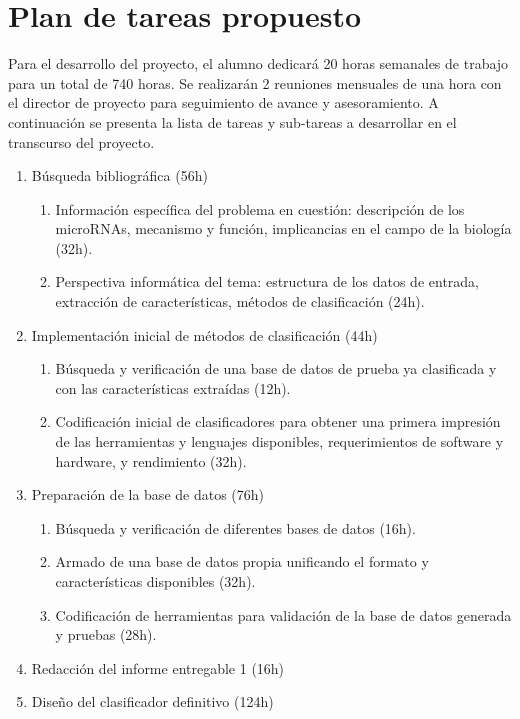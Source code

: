 \documentclass[12pt,bibliography=oldstyle,DIV=14,parskip=full-,titlepage]{scrartcl}
\begin{document}
\section{Plan de tareas propuesto}
Para el desarrollo del proyecto, el alumno dedicará 20 horas semanales
de trabajo para un total de 740 horas.  Se realizarán 2
reuniones mensuales de una hora con el director de proyecto para
seguimiento de avance y asesoramiento.
%
A continuación se presenta la lista de tareas y sub-tareas a
desarrollar en el transcurso del proyecto.
\begin{enumerate}
\item Búsqueda bibliográfica (56h)
  \begin{enumerate}
  \item Información específica del problema en cuestión: descripción
    de los microRNAs, mecanismo y función, implicancias en el campo de
    la biología (32h).
  \item Perspectiva informática del tema: estructura de los datos de
    entrada, extracción de características, métodos de clasificación
    (24h).
  \end{enumerate}
\item Implementación inicial de métodos de clasificación (44h)
  \begin{enumerate}
  \item Búsqueda y verificación de una base de datos de prueba ya
    clasificada y con las características extraídas (12h).
  \item Codificación inicial de clasificadores para obtener una
    primera impresión de las herramientas y lenguajes disponibles,
    requerimientos de software y hardware, y rendimiento (32h).
  \end{enumerate}
\item Preparación de la base de datos (76h)
  \begin{enumerate}
  \item Búsqueda y verificación de diferentes bases de datos (16h).
  \item Armado de una base de datos propia unificando el formato y
    características disponibles (32h).
  \item Codificación de herramientas para validación de la base de
    datos generada y pruebas (28h).
  \end{enumerate}
\item Redacción del informe entregable 1 (16h)
\item Diseño del clasificador definitivo (124h)
  \begin{enumerate}

\end{enumerate}
\end{enumerate}
\end{document}
